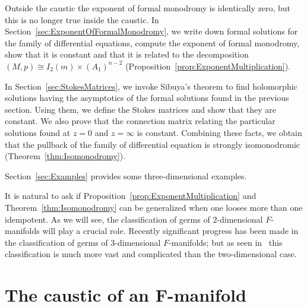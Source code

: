 \documentclass[10pt,a4paper]{amsart}
\numberwithin{equation}{section}
\begin{document}
Outside the caustic the exponent of formal monodromy is identically zero, but this is no longer true inside the caustic. In Section~\ref{sec:ExponentOfFormalMonodromy}, we write down formal solutions for the family of differential equations, compute the exponent of formal monodromy, show that it is constant and that it is related to the decomposition $(M,p)\cong I_{2}(m)\times (A_{1})^{n-2}$ (Proposition~\ref{prop:ExponentMultiplication}).

In Section~\ref{sec:StokesMatrices}, we invoke Sibuya's theorem to find holomorphic solutions having the asymptotics of the formal solutions found in the previous section. Using them, we define the Stokes matrices and show that they are constant. We also prove that the connection matrix relating the particular solutions found at $z=0$ and $z=\infty$ is constant. Combining these facts, we obtain that the pullback of the family of differential equation is strongly isomonodromic (Theorem~\ref{thm:Isomonodromy}).

 Section~\ref{sec:Examples} provides some three-dimensional examples.

It is natural to ask if Proposition~\ref{prop:ExponentMultiplication} and Theorem~\ref{thm:Isomonodromy} can be generalized when one looses more than one idempotent. As we will see, the classification of germs of $2$-dimensional $F$-manifolds will play a crucial role. Recently significant progress has been made in the classification of germs of $3$-dimensional $F$-manifolds; but as seen in~\cite{Basalaev_2021} this classification is much more vast and complicated than the two-dimensional case.

\section[The caustic of an F-manifold]{The caustic of an $\boldsymbol{F}$-manifold}
\label{sec:FManifolds}
\end{document}
